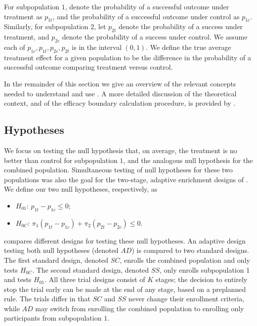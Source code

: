 \documentclass[article]{jss}
\begin{document}
For subpopulation $1$, denote the probability of a successful outcome under treatment as $p_{1t}$, and the probability of a successful outcome under control as $p_{1c}$. Similarly, for subpopulation $2$, let $p_{2t}$ denote the probability of a success under treatment, and $p_{2c}$ denote the probability of a success under control. 
We assume each of $p_{1c},p_{1t},p_{2c},p_{2t}$ is in the interval $(0,1)$.
We define the true average treatment effect for a given population to be the difference in the probability of a successful outcome comparing treatment versus control.


In the remainder of this section we give an overview of the relevant concepts needed to understand and use . A more detailed discussion of the theoretical context, and of the efficacy boundary calculation procedure, is provided by \cite{Rosenblum2013AdaptMISTIE}.
 

\subsection{Hypotheses}
\label{sub:hypotheses}


We focus on testing the null hypothesis that, on average, the treatment is no better than control for subpopulation $1$, and the analogous null hypothesis for the combined population. Simultaneous testing of null hypotheses for these two populations was also the goal for the two-stage, adaptive enrichment designs of \cite{wangetal2007}.
We define our two null hypotheses, respectively, as

\begin{itemize}
\item $H_{01}$: $p_{1t}-p_{1c}≤0$;%
\item $H_{0C}$: $π_1(p_{1t}-p_{1c}) + π_2(p_{2t}-p_{2c}) ≤ 0$. %
\end{itemize}



 compares different designs for testing these null hypotheses. 
An adaptive design testing both null hypotheses (denoted $AD$) is compared to two standard designs. The first standard design, denoted $SC$, enrolls the combined population and only tests $H_{0C}$. The second standard design, denoted $SS$, only enrolls subpopulation 1 and tests $H_{01}$.
All three trial designs consist of $K$ stages; the decision to entirely stop the trial early can be made at the end of any stage, based on a preplanned rule. The trials differ in that $SC$ and $SS$ never change their enrollment criteria, while $AD$ may switch from enrolling the combined population  to enrolling only participants from subpopulation $1$.
\end{document}
